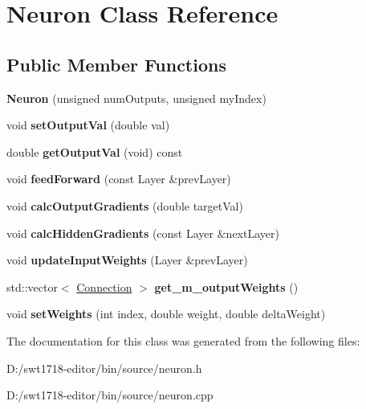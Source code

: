 \hypertarget{class_neuron}{}\section{Neuron Class Reference}
\label{class_neuron}
\subsection*{Public Member Functions}
\begin{DoxyCompactItemize}
\item 
\mbox{\label{class_neuron_aac8e77c54251e7e30f1b59e768f16db2}} 
{\bfseries Neuron} (unsigned num\+Outputs, unsigned my\+Index)
\item 
\mbox{\label{class_neuron_a219bfcc8c9cd5cc634fef77bccb72d84}} 
void {\bfseries set\+Output\+Val} (double val)
\item 
\mbox{\label{class_neuron_ac0e4317b5146cebd2abda0b9f6d3af6f}} 
double {\bfseries get\+Output\+Val} (void) const
\item 
\mbox{\label{class_neuron_a67c71b826dcfe651bf188869df932f02}} 
void {\bfseries feed\+Forward} (const Layer \&prev\+Layer)
\item 
\mbox{\label{class_neuron_aed841fbec8dd00df77fc802c6934f903}} 
void {\bfseries calc\+Output\+Gradients} (double target\+Val)
\item 
\mbox{\label{class_neuron_a6872e68ea8229653280d29e052440937}} 
void {\bfseries calc\+Hidden\+Gradients} (const Layer \&next\+Layer)
\item 
\mbox{\label{class_neuron_a09d963e955e9cf91a078f60f11ee2c47}} 
void {\bfseries update\+Input\+Weights} (Layer \&prev\+Layer)
\item 
\mbox{\label{class_neuron_aa3f1bcf80f7a12bf2c4cf1b7efe8ccab}} 
std\+::vector$<$ \mbox{\hyperlink{struct_connection}{Connection}} $>$ {\bfseries get\+\_\+m\+\_\+output\+Weights} ()
\item 
\mbox{\label{class_neuron_acee33f1da8cdb10647fccdfadf2766a8}} 
void {\bfseries set\+Weights} (int index, double weight, double delta\+Weight)
\end{DoxyCompactItemize}


The documentation for this class was generated from the following files\+:\begin{DoxyCompactItemize}
\item 
D\+:/swt1718-\/editor/bin/source/neuron.\+h\item 
D\+:/swt1718-\/editor/bin/source/neuron.\+cpp\end{DoxyCompactItemize}
